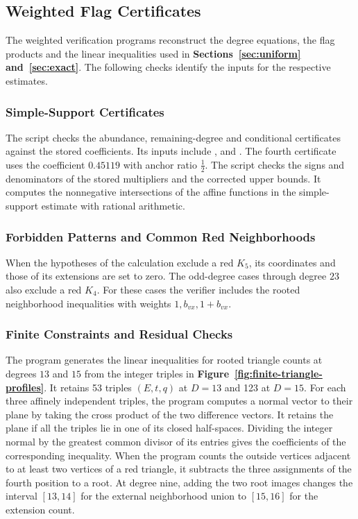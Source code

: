 \subsection{Weighted Flag Certificates}\label{app:multi-certificates}

The weighted verification programs reconstruct the degree equations,
the flag products and the linear inequalities used in
\textbf{Sections~\ref{sec:uniform} and~\ref{sec:exact}}.
The following checks identify the inputs for the respective estimates.

\subsubsection{Simple-Support Certificates}\label{app:multi-projection}

The script  checks the abundance,
remaining-degree and conditional certificates against the stored
coefficients. Its inputs include
,
 and
. The fourth
certificate uses the coefficient $0.45119$ with anchor ratio
$\frac12$. The script checks the signs and denominators of the
stored multipliers and the corrected upper bounds.
It computes the nonnegative intersections of the affine functions
in the simple-support estimate with rational arithmetic.

\subsubsection{Forbidden Patterns and Common Red Neighborhoods}

When the hypotheses of the calculation exclude a red $K_5$, its
coordinates and those of its extensions are set to zero.
The odd-degree cases through degree $23$ also exclude a red $K_4$.
For these cases the verifier includes the rooted neighborhood
inequalities with weights $1,b_{vx},1+b_{vx}$.

\subsubsection{Finite Constraints and Residual Checks}\label{app:profile-verification}

The program  generates the
linear inequalities for rooted triangle counts at degrees $13$
and $15$ from the integer triples in
\textbf{Figure~\ref{fig:finite-triangle-profiles}}. It retains 53 triples
$(E,t,q)$ at $D=13$ and 123 at $D=15$. For each three affinely independent
triples, the program computes a normal vector to their plane by taking
the cross product of the two difference vectors. It retains the plane
if all the triples lie in one of its closed half-spaces. Dividing the
integer normal by the greatest common divisor of its entries gives the
coefficients of the corresponding inequality.
When the program counts the outside vertices adjacent to at least
two vertices of a red triangle, it subtracts the three assignments of the fourth
position to a root. At degree nine, adding the two root images
changes the interval $[13,14]$ for the external neighborhood union
to $[15,16]$ for the extension count.

